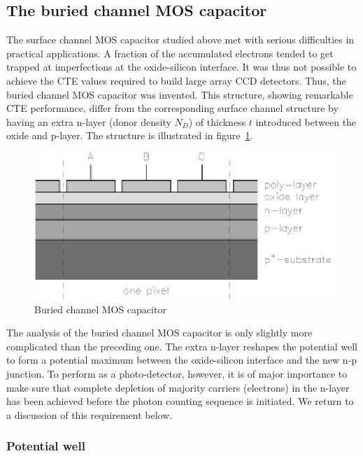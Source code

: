 \subsection{The buried channel MOS capacitor}

The surface channel MOS capacitor studied above met with serious
difficulties in practical applications. A fraction of the accumulated
electrons tended to get trapped at imperfections at the oxide-silicon
interface. It was thus not possible to achieve the CTE values required
to build large array CCD detectors. Thus, the buried channel MOS
capacitor was invented. This structure, showing remarkable CTE
performance, differ from the corresponding surface channel structure
by having an extra n-layer (donor density $N_D$) of thickness $t$
introduced between the oxide and p-layer. The structure is
illustrated in figure~\ref{CCD.fignMOS}.

\begin{figure}[h]
  \centering
	\includegraphics{CCD_nMOS.eps}
  \caption{Buried channel MOS capacitor}
  \label{CCD.fignMOS}
\end{figure}

The analysis of the buried channel MOS capacitor is only slightly more
complicated than the preceding one. The extra n-layer reshapes the
potential well to form a potential maximum between the oxide-silicon
interface and the new n-p junction. To perform as a photo-detector,
however, it is of major importance to make sure that complete
depletion of majority carriers (electrons) in the n-layer has been
achieved before the photon counting sequence is initiated. We return
to a discussion of this requirement below.

\subsubsection{Potential well}

